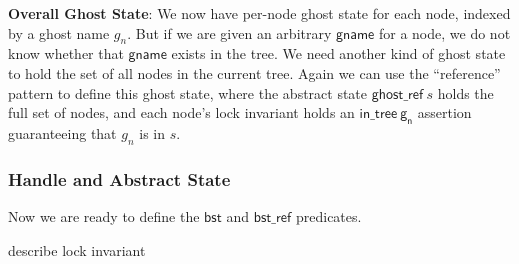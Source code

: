 \documentclass[acmsmall,screen]{acmart}\settopmatter{printfolios=true}
\newcommand{\gnamety}{\ensuremath{\mathsf{gname}}}
\newcommand{\treerep}{\ensuremath{\mathsf{bst}}}
\newcommand{\nodeboxrep}{\ensuremath{\mathsf{bst\_ref}}}
\newcommand{\ignore}[1]{}
\begin{document}
\textbf{Overall Ghost State}: We now have per-node ghost state for each node, indexed by a ghost name $g_n$. But if we are given an arbitrary $\gnamety$ for a node, we do not know whether that $\gnamety$ exists in the tree. We need another kind of ghost state to hold the set of all nodes in the current tree. Again we can use the ``reference'' pattern to define this ghost state, where the abstract state $\mathsf{ghost\_ref}\ s$ holds the full set of nodes, and each node's lock invariant holds an $\mathsf{in\_tree\ g_n}$ assertion guaranteeing that $g_n$ is in $s$.%
\ignore{\begin{verbatim}
Definition ghost_ref g r1 := ghost_reference(P := set_PCM) r1 g.
Definition in_tree g g1 := EX sh: share, ghost_part(P :=set_PCM) sh (Ensembles.Singleton g1) g.
\end{verbatim}}
\ignore{The global invariant, which we introduced in our atomic specification as the $\treerep$ predicate above, ties together the pieces as follows:
\begin{align*}\treerep(T,g) \triangleq *_n. \mathsf{public\_half\textsubscript{gn}} \ (\mathit{range}_n* \mathit{ghost\_info}_n)\ ] *\ \mathsf{ghost\_ref}\ g\ \{ gn\  \} \end{align*}
 Later while writing atomic specification, we will use $\mathsf{ghost\_ref}$ and $\mathsf{in\_tree}$ in the public and private part respectively. Once we open \emph{global invariant}, we get access to $\mathsf{ghost\_ref}$ which will be used with $\mathsf{in\_tree}$ to establish the fact that node actually exists in the tree. We proved the following lemma for this:
$$
Lemma\ \mathbf{\ node\_exist\_in\_tree : }\ \forall\ g\ s\ g\_in,\  \mathbf{in\_tree}\ g\ g\_in  * \mathbf{ghost\_ref}\ g\ s\ \Rightarrow\ g\_in\ \in s .
$$}
\subsubsection{Handle and Abstract State}
Now we are ready to define the $\treerep$ and $\nodeboxrep$ predicates.

describe lock invariant
\end{document}
